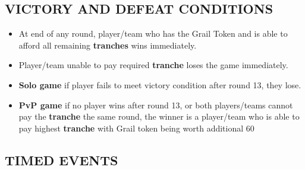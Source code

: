 \begin{multicols*}{2}
    \subsection*{\MakeUppercase{Victory and Defeat Conditions}}

    \begin{itemize}
        \item At end of any round, player/team who has the Grail Token and is able to afford all remaining \textbf{tranches} wins immediately.
        \item Player/team unable to pay required \textbf{tranche} loses the game immediately.
        \item \textbf{Solo game} if player fails to meet victory condition after round 13, they lose.
        \item \textbf{PvP game} if no player wins after round 13, or both players/teams cannot pay the \textbf{tranche} the same round, the winner is a player/team who is able to pay highest \textbf{tranche} with Grail token being worth additional 60 
    \end{itemize}

    \vfill

    \subsection*{\MakeUppercase{Timed Events}}

    \begin{table*}[b!]
    \end{table*}


\end{multicols*}
